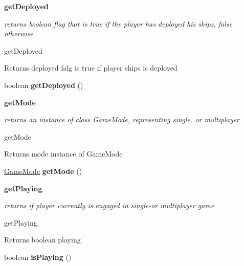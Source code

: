 \begin{Indent}{\bf get\+Deployed}\par
{\em returns boolean flag that is true if the player has deployed his ships, false otherwise

get\+Deployed

\begin{DoxyReturn}{Returns}
deployed falg is true if player ships is deployed 
\end{DoxyReturn}
}\begin{DoxyCompactItemize}
\item 
\hypertarget{classbattleship_1_1network_1_1PlayerProxy_aee98d9ae3714b8a0018e2c5b5531a82d}{}boolean {\bfseries get\+Deployed} ()\label{classbattleship_1_1network_1_1PlayerProxy_aee98d9ae3714b8a0018e2c5b5531a82d}

\end{DoxyCompactItemize}
\end{Indent}
\begin{Indent}{\bf get\+Mode}\par
{\em returns an instance of class Game\+Mode, representing single. or multiplayer

get\+Mode

\begin{DoxyReturn}{Returns}
mode instance of Game\+Mode 
\end{DoxyReturn}
}\begin{DoxyCompactItemize}
\item 
\hypertarget{classbattleship_1_1network_1_1PlayerProxy_a48401ef5c1eb9328fa7234a534a73ced}{}\hyperlink{enumbattleship_1_1game_1_1GameMode}{Game\+Mode} {\bfseries get\+Mode} ()\label{classbattleship_1_1network_1_1PlayerProxy_a48401ef5c1eb9328fa7234a534a73ced}

\end{DoxyCompactItemize}
\end{Indent}
\begin{Indent}{\bf get\+Playing}\par
{\em returns if player currently is engaged in single-\/or multiplayer game

get\+Playing

\begin{DoxyReturn}{Returns}
boolean playing 
\end{DoxyReturn}
}\begin{DoxyCompactItemize}
\item 
\hypertarget{classbattleship_1_1network_1_1PlayerProxy_ac7ebc73d91fd7646d6a1431ca2b08565}{}boolean {\bfseries is\+Playing} ()\label{classbattleship_1_1network_1_1PlayerProxy_ac7ebc73d91fd7646d6a1431ca2b08565}

\end{DoxyCompactItemize}
\end{Indent}
